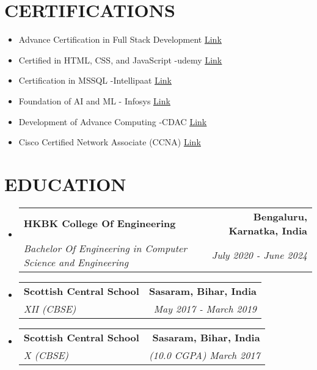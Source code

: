 \documentclass[letterpaper,11pt]{article}
\makeatletter
\newcommand{\resumeItem}[1]{
  \item\small{
    {#1 \vspace{-1pt}}
  }
}
\newcommand{\resumeSubheading}[4]{
  \vspace{-2pt}\item
    \begin{tabular*}{1.0\textwidth}[t]{l@{\extracolsep{\fill}}r}
      \textbf{\large#1} & \textbf{\small #2} \\
      \textit{\large#3} & \textit{\small #4} \\
      
    \end{tabular*}\vspace{-7pt}
}
\newcommand{\resumeSubHeadingListStart}{\begin{itemize}[leftmargin=0.0in, label={}]}
\newcommand{\resumeSubHeadingListEnd}{\end{itemize}}
\newcommand{\resumeItemListStart}{\begin{itemize}[leftmargin=0.1in]}
\newcommand{\resumeItemListEnd}{\end{itemize}\vspace{-5pt}}
\makeatother
\begin{document}
\begin{minipage}[t]{0.48\textwidth}
    \section{\color{airforceblue}CERTIFICATIONS}
    \resumeItemListStart
        \resumeItem{\normalsize{Advance Certification in Full Stack Development}}\href{https://ibharatbhushan.netlify.app/certification}{\color{blue}\underline{Link}}
        \vspace{-5pt}
        
        \resumeItem{\normalsize{Certified in HTML, CSS, and JavaScript -udemy}}\href{https://ibharatbhushan.netlify.app/assets/pdfs/web_dev.pdf}{\color{blue}\underline{Link}}
        \vspace{-5pt}
        \resumeItem{\normalsize{Certification in MSSQL -Intellipaat}}\href{https://ibharatbhushan.netlify.app/assets/pdfs/mssql.pdf}{\color{blue}\underline{Link}}
        \vspace{-5pt}
        \resumeItem{\normalsize{Foundation of AI and ML - Infosys}}\href{https://ibharatbhushan.netlify.app/assets/pdfs/1722165951450.pdf}{\color{blue}\underline{Link}}
        \vspace{-5pt}
        \resumeItem{\normalsize{
Development of Advance Computing -CDAC}}\href{https://ibharatbhushan.netlify.app/assets/pdfs/1722165709872.pdf}{\color{blue}\underline{Link}}
        \vspace{-5pt}
         \resumeItem{\normalsize{
Cisco Certified Network Associate (CCNA)}}\href{https://ibharatbhushan.netlify.app/assets/pdfs/bharat.pdf}{\color{blue}\underline{Link}}
        \vspace{-5pt}
        
        
    \resumeItemListEnd 
\end{minipage}

\vspace{-5pt}


\section{\color{airforceblue}EDUCATION}
 \resumeSubHeadingListStart
    \resumeSubheading
      {HKBK College Of Engineering}{Bengaluru, Karnatka, India}
      {Bachelor Of Engineering in Computer Science and Engineering}{July 2020 - June 2024}
    \vspace{-4pt}
     \resumeSubheading
      {Scottish Central School}{Sasaram, Bihar, India}
      {XII (CBSE)}{May 2017 - March 2019}
      \vspace{-4pt}
     \resumeSubheading
      {Scottish Central School}{Sasaram, Bihar, India}
      {X (CBSE)}{(10.0 CGPA) March 2017}
  \resumeSubHeadingListEnd
  \vspace{-10pt}
\end{document}
